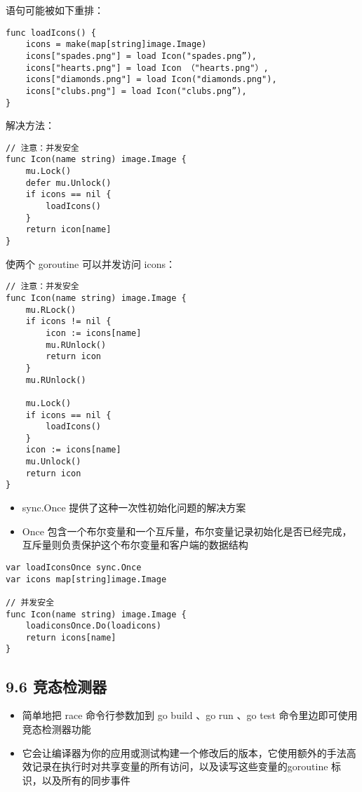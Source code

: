语句可能被如下重排：

\begin{verbatim}
func loadIcons() {
    icons = make(map[string]image.Image)
    icons["spades.png"] = load Icon("spades.png”),
    icons["hearts.png"] = load Icon （"hearts.png"）,
    icons["diamonds.png"] = load Icon("diamonds.png"),
    icons["clubs.png"] = load Icon("clubs.png”),
}
\end{verbatim}

解决方法：

\begin{verbatim}
// 注意：并发安全
func Icon(name string) image.Image {
    mu.Lock()
    defer mu.Unlock()
    if icons == nil {
        loadIcons()
    }
    return icon[name]
}
\end{verbatim}

使两个 goroutine 可以并发访问 icons：

\begin{verbatim}
// 注意：并发安全
func Icon(name string) image.Image {
    mu.RLock()
    if icons != nil {
        icon := icons[name]
        mu.RUnlock()
        return icon
    }
    mu.RUnlock()
    
    mu.Lock()
    if icons == nil {
        loadIcons()
    }
    icon := icons[name]
    mu.Unlock()
    return icon
}
\end{verbatim}

\begin{itemize}
\tightlist
\item
  sync.Once 提供了这种一次性初始化问题的解决方案
\item
  Once
  包含一个布尔变量和一个互斥量，布尔变量记录初始化是否已经完成，互斥量则负责保护这个布尔变量和客户端的数据结构
\end{itemize}

\begin{verbatim}
var loadIconsOnce sync.Once
var icons map[string]image.Image

// 并发安全
func Icon(name string) image.Image {
    loadiconsOnce.Do(loadicons)
    return icons[name]
}
\end{verbatim}

\subsection{9.6 竞态检测器}

\begin{itemize}
\tightlist
\item
  简单地把 race 命令行参数加到 go build 、go run 、go test
  命令里边即可使用竞态检测器功能
\item
  它会让编译器为你的应用或测试构建一个修改后的版本，它使用额外的手法高效记录在执行时对共享变量的所有访问，以及读写这些变量的goroutine
  标识，以及所有的同步事件
\end{itemize}

